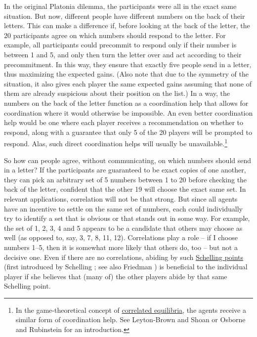 In the original Platonia dilemma, the participants were all in the exact
same situation. But now, different people have different numbers on the
back of their letters. This can make a difference if, before looking at
the back of the letter, the 20 participants agree on which numbers
should respond to the letter. For example, all participants could
precommit to respond only if their number is between 1 and 5, and only
then turn the letter over and act according to their precommitment. In
this way, they ensure that exactly five people send in a letter, thus
maximizing the expected gains. (Also note that due to the symmetry of
the situation, it also gives each player the same expected gains
assuming that none of them are already suspicious about their position
on the list.) In a way, the numbers on the back of the letter function
as a coordination help that allows for coordination where it would
otherwise be impossible. An even better coordination help would be one
where each player receives a recommendation on whether to respond, along
with a guarantee that only 5 of the 20 players will be prompted to
respond. Alas, such direct coordination helps will usually be
unavailable.\footnote{In the game-theoretical concept of
  \href{https://en.wikipedia.org/wiki/Correlated_equilibrium}{correlated
  equilibria}, the agents receive a similar form of coordination help.
  See Leyton-Brown and Shoan \citeyear{Leyton-Brown2008-un} or
  Osborne and Rubinstein \citeyear{Osborne1994-ln} for an introduction.}

So how can people agree, without communicating, on which numbers should
send in a letter? If the participants are guaranteed to be exact copies
of one another, they can pick an arbitrary set of 5 numbers between 1 to
20 before checking the back of the letter, confident that the other 19
will choose the exact same set. In relevant applications, correlation
will not be that strong. But since all agents have an incentive to
settle on the same set of numbers, each could individually try to
identify a set that is obvious or that stands out in some way. For
example, the set of 1, 2, 3, 4 and 5 appears to be a candidate that
others may choose as well (as opposed to, say, 3, 7, 8, 11, 12).
Correlations play a role -- if I choose numbers 1--5, then it is
somewhat more likely that others do, too -- but not a decisive one. Even
if there are no correlations, abiding by such
\href{https://en.wikipedia.org/wiki/Focal_point_(game_theory)}{Schelling
points} (first introduced by Schelling \citeyear{Schelling1960-dn};
see also Friedman \citeyear{Friedman1994-ie}) is beneficial to the
individual player if she believes that (many of) the other players abide
by that same Schelling point.

